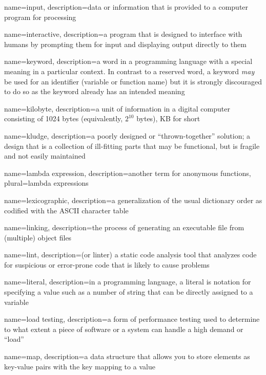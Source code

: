 {
  name=input,
  description={data or information that is provided to a computer program for processing}
}

{
  name=interactive,
  description={a program that is designed to interface with humans by prompting them for input and displaying output directly to them}
}

{
  name=keyword,
  description={a word in a programming language with a special meaning in a particular context.  In
	contrast to a reserved word, a keyword \emph{may} be used for an identifier (variable or function name)
	but it is strongly discouraged to do so as the keyword already has an intended meaning}
}

{
  name=kilobyte,
  description={a unit of information in a digital computer consisting of 1024 bytes (equivalently, $2^{10}$ bytes), KB for short}
}

{
  name=kludge,
  description={a poorly designed or ``thrown-together'' solution; a design that is a collection of ill-fitting parts that may be functional, but is fragile and not easily maintained}
}

{
  name=lambda expression,
  description={another term for anonymous functions},
  plural=lambda expressions
}

{
  name=lexicographic,
  description={a generalization of the usual dictionary order as codified with the ASCII character table}
}

{
  name=linking,
  description={the process of generating an executable file from (multiple) object files}
}

{
  name=lint,
  description={(or linter) a static code analysis tool that analyzes code for suspicious or error-prone code that is likely to cause problems}
}

{
  name=literal,
  description={in a programming language, a literal is notation for specifying a value such as a number of string that can be 
  	directly assigned to a variable}
}

{
  name=load testing,
  description={a form of performance testing used to determine to what extent a piece of software or a system can handle a high demand or ``load''}
}

{
  name=map,
  description={a data structure that allows you to store elements as key-value pairs with the key mapping to a value}
}

